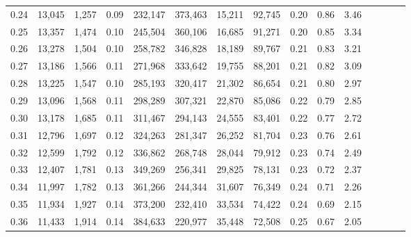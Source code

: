 \begin{tabular}{rrrcrrrrrrrrrrr}
0.24 &  13,045 &  1,257 &                                       0.09 &  232,147 &  373,463 &   15,211 &   92,745 &  0.20 &  0.86 &                         3.46 \\
0.25 &  13,357 &  1,474 &                                       0.10 &  245,504 &  360,106 &   16,685 &   91,271 &  0.20 &  0.85 &                         3.34 \\
0.26 &  13,278 &  1,504 &                                       0.10 &  258,782 &  346,828 &   18,189 &   89,767 &  0.21 &  0.83 &                         3.21 \\
0.27 &  13,186 &  1,566 &                                       0.11 &  271,968 &  333,642 &   19,755 &   88,201 &  0.21 &  0.82 &                         3.09 \\
0.28 &  13,225 &  1,547 &                                       0.10 &  285,193 &  320,417 &   21,302 &   86,654 &  0.21 &  0.80 &                         2.97 \\
0.29 &  13,096 &  1,568 &                                       0.11 &  298,289 &  307,321 &   22,870 &   85,086 &  0.22 &  0.79 &                         2.85 \\
0.30 &  13,178 &  1,685 &                                       0.11 &  311,467 &  294,143 &   24,555 &   83,401 &  0.22 &  0.77 &                         2.72 \\
0.31 &  12,796 &  1,697 &                                       0.12 &  324,263 &  281,347 &   26,252 &   81,704 &  0.23 &  0.76 &                         2.61 \\
0.32 &  12,599 &  1,792 &                                       0.12 &  336,862 &  268,748 &   28,044 &   79,912 &  0.23 &  0.74 &                         2.49 \\
0.33 &  12,407 &  1,781 &                                       0.13 &  349,269 &  256,341 &   29,825 &   78,131 &  0.23 &  0.72 &                         2.37 \\
0.34 &  11,997 &  1,782 &                                       0.13 &  361,266 &  244,344 &   31,607 &   76,349 &  0.24 &  0.71 &                         2.26 \\
0.35 &  11,934 &  1,927 &                                       0.14 &  373,200 &  232,410 &   33,534 &   74,422 &  0.24 &  0.69 &                         2.15 \\
0.36 &  11,433 &  1,914 &                                       0.14 &  384,633 &  220,977 &   35,448 &   72,508 &  0.25 &  0.67 &                         2.05 \\

\end{tabular}

